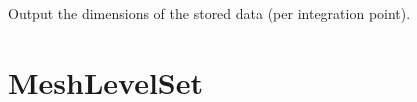 \documentclass[a4paper,11pt,english]{sphinxmanual}
\begin{document}
\begin{fulllineitems}
\begin{fulllineitems}
\end{fulllineitems}


\begin{fulllineitems}
\label{\detokenize{python/cmdref_MeshImData:getfem.MeshImData.tensor_size}}
Output the dimensions of the stored data (per integration point).

\end{fulllineitems}


\end{fulllineitems}



\section{MeshLevelSet}
\label{\detokenize{python/cmdref_MeshLevelSet:meshlevelset}}\label{\detokenize{python/cmdref_MeshLevelSet::doc}}
\end{document}
